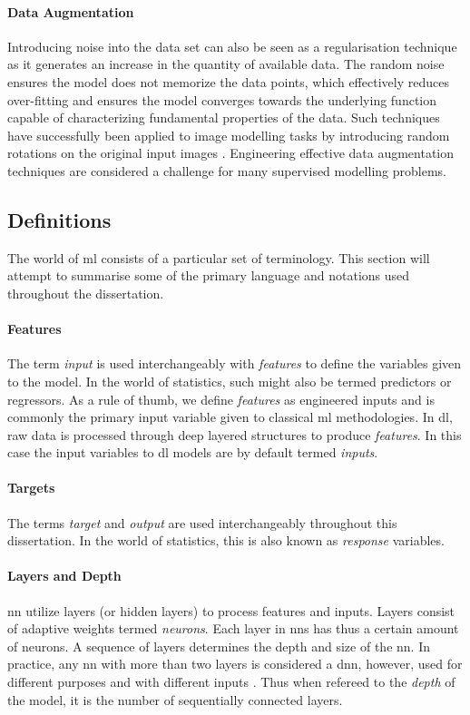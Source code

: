 \paragraph{Data Augmentation}
Introducing noise into the data set can also be seen as a regularisation technique as it generates an increase in the quantity of available data. The random noise ensures the model does not memorize the data points, which effectively reduces over-fitting and ensures the model converges towards the underlying function capable of characterizing fundamental properties of the data. Such techniques have successfully been applied to image modelling tasks by introducing random rotations on the original input images \cite{Shorten2019ALearning}. Engineering effective data augmentation techniques are considered a challenge for many supervised modelling problems. 

\subsection{Definitions}
The world of \gls{ml} consists of a particular set of terminology. This section will attempt to summarise some of the primary language and notations used throughout the dissertation.

\paragraph{Features}
The term \emph{input} is used interchangeably with \emph{features} to define the variables given to the model. In the world of statistics, such might also be termed predictors or regressors. As a rule of thumb, we define \emph{features} as engineered inputs and is commonly the primary input variable given to classical \gls{ml} methodologies. In \gls{dl}, raw data is processed through deep layered structures to produce \emph{features}. In this case the input variables to \gls{dl} models are by default termed \emph{inputs}. 

\paragraph{Targets}
The terms \emph{target} and \emph{output} are used interchangeably throughout this dissertation. In the world of statistics, this is also known as \emph{response} variables. 

\paragraph{Layers and Depth}
\gls{nn} utilize layers (or hidden layers) to process features and inputs. Layers consist of adaptive weights termed \emph{neurons}. Each layer in \glspl{nn} has thus a certain amount of neurons. A sequence of layers determines the depth and size of the \gls{nn}. In practice, any \gls{nn} with more than two layers is considered a \gls{dnn}, however, used for different purposes and with different inputs \cite{M.Bishop2006}. Thus when refereed to the \emph{depth} of the model, it is the number of sequentially connected layers. 

